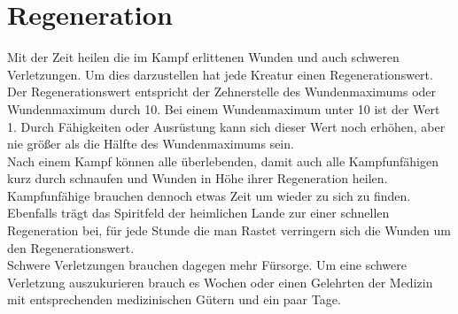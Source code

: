 \section{Regeneration}
Mit der Zeit heilen die im Kampf erlittenen Wunden und auch schweren Verletzungen.
Um dies darzustellen hat jede Kreatur einen Regenerationswert. Der Regenerationswert entspricht der Zehnerstelle des Wundenmaximums oder Wundenmaximum durch 10. Bei einem Wundenmaximum unter 10 ist der Wert 1. Durch Fähigkeiten oder Ausrüstung kann sich dieser Wert noch erhöhen, aber nie größer als die Hälfte des Wundenmaximums sein.\\
Nach einem Kampf können alle überlebenden, damit auch alle Kampfunfähigen kurz durch schnaufen und Wunden in Höhe ihrer Regeneration heilen. Kampfunfähige brauchen dennoch etwas Zeit um wieder zu sich zu finden.
Ebenfalls trägt das Spiritfeld der heimlichen Lande zur einer schnellen Regeneration bei, für jede Stunde die man Rastet verringern sich die Wunden um den Regenerationswert.\\
Schwere Verletzungen brauchen dagegen mehr Fürsorge. Um eine schwere Verletzung auszukurieren brauch es Wochen oder einen Gelehrten der Medizin mit entsprechenden medizinischen Gütern und ein paar Tage. 

\clearpage
